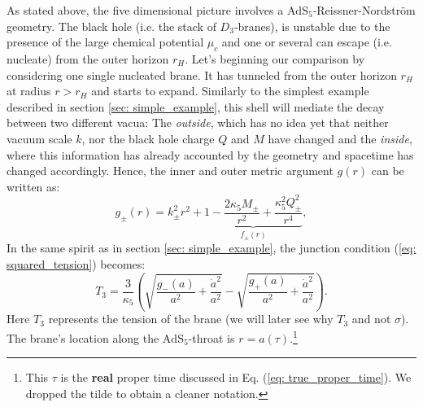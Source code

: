 As stated above, the five dimensional picture involves a $\text{AdS}_{5}$-Reissner-Nordström geometry. The black hole (i.e. the stack of $D_{3}$-branes), is unstable due to the presence of the large chemical potential $\mu_{c}$ and one or several can escape (i.e. nucleate) from the outer horizon $r_{H}$. Let's beginning our comparison by considering one single nucleated brane. It has tunneled from the outer horizon $r_{H}$ at radius $r > r_{H}$ and starts to expand. Similarly to the simplest example described in section \ref{sec: simple_example}, this shell will mediate the decay between two different vacua: The \textit{outside}, which has no idea yet that neither vacuum scale $k$, nor the black hole charge $Q$ and $M$ have changed and the \textit{inside}, where this information has already accounted by the geometry and spacetime has changed accordingly. Hence, the inner and outer metric argument $g(r)$ can be written as:
\begin{equation}
     g_{\pm}(r)=k_{\pm}^2 r^2 + \underbrace{1-\frac{2\kappa_5 M_{\pm}}{r^2}+\frac{\kappa_5^2 Q_{\pm}^2}{r^4}}_{f_{\pm}(r)},
\end{equation}
In the same spirit as in section \ref{sec: simple_example}, the junction condition (\ref{eq: squared_tension}) becomes:
\begin{equation} \label{eq: junction_embedding}
    T_3 = \frac{3}{\kappa_{5}}\left(\sqrt{\frac{g_-(a)}{a^2}+\frac{\dot{a}^2}{a^2}}-\sqrt{\frac{g_+(a)}{a^2}+\frac{\dot{a}^2}{a^2}}\right).
\end{equation}
Here $T_{3}$ represents the tension of the brane (we will later see why $T_{3}$ and not $\sigma$). The brane's location along the $\text{AdS}_{5}$-throat is $r=a(\tau)$.\footnote{This $\tau$ is the \textbf{real} proper time discussed in Eq. (\ref{eq: true_proper_time}). We dropped the tilde to obtain a cleaner notation.}

